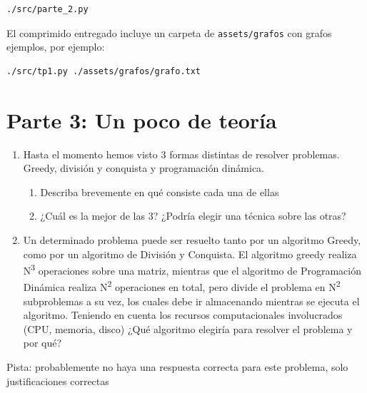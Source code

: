 \documentclass[titlepage,a4paper]{article}
\begin{document}
\begin{verbatim}
./src/parte_2.py
\end{verbatim}

El comprimido entregado incluye un carpeta de \texttt{assets/grafos} con grafos ejemplos,
por ejemplo:

\begin{verbatim}
./src/tp1.py ./assets/grafos/grafo.txt
\end{verbatim}
\section{Parte 3: Un poco de teoría}
\label{sec:org2b9a059}

\begin{enumerate}
\item Hasta el momento hemos visto 3 formas distintas de resolver problemas. Greedy, división y conquista y programación dinámica.

\begin{enumerate}
\item Describa brevemente en qué consiste cada una de ellas

\item ¿Cuál es la mejor de las 3? ¿Podría elegir una técnica sobre las otras?
\end{enumerate}

\item Un determinado problema puede ser resuelto tanto por un algoritmo Greedy, como por un algoritmo de División y Conquista. El algoritmo greedy realiza N\textsuperscript{3} operaciones sobre una matriz, mientras que el algoritmo de Programación Dinámica realiza N\textsuperscript{2} operaciones en total, pero divide el problema en N\textsuperscript{2} subproblemas a su vez, los cuales debe ir almacenando mientras se ejecuta el algoritmo. Teniendo en cuenta los recursos computacionales involucrados (CPU, memoria, disco) ¿Qué algoritmo elegiría para resolver el problema y por qué?
\end{enumerate}

Pista: probablemente no haya una respuesta correcta para este problema, solo justificaciones correctas
\end{document}
